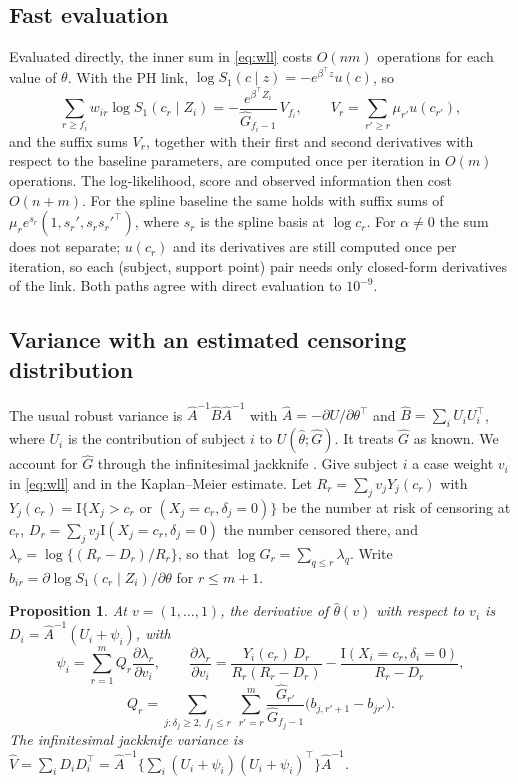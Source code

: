 \documentclass[11pt]{article}
\newtheorem{proposition}{Proposition}
\newcommand{\I}{\mathrm{I}}
\newcommand{\T}{\top}
\newcommand{\Ghat}{\widehat G}
\begin{document}
\subsection{Fast evaluation}\label{sec:fast}
Evaluated directly, the inner sum in \eqref{eq:wll} costs $O(nm)$ operations for each value of
$\theta$. With the PH link, $\log S_1(c \mid z) = -e^{\beta^\T z} u(c)$, so
\[
\sum_{r \ge f_i} w_{ir} \log S_1(c_r \mid Z_i) = -\frac{e^{\beta^\T Z_i}}{\Ghat_{f_i - 1}} \, V_{f_i},
\qquad V_r = \sum_{r' \ge r} \mu_{r'} u(c_{r'}),
\]
and the suffix sums $V_r$, together with their first and second derivatives with respect to the
baseline parameters, are computed once per iteration in $O(m)$ operations. The log-likelihood,
score and observed information then cost $O(n + m)$. For the spline baseline the same holds with
suffix sums of $\mu_r e^{s_r}(1, s_r', s_r s_r'^\T)$, where $s_r$ is the spline basis at $\log c_r$.
For $\alpha \ne 0$ the sum does not separate; $u(c_r)$ and its derivatives are still computed
once per iteration, so each (subject, support point) pair needs only closed-form derivatives of
the link. Both paths agree with direct evaluation to $10^{-9}$.

\subsection{Variance with an estimated censoring distribution}\label{sec:psi}
The usual robust variance \citep{white1982} is $\hat A^{-1} \hat B \hat A^{-1}$ with
$\hat A = -\partial U/\partial \theta^\T$ and $\hat B = \sum_i U_i U_i^\T$, where $U_i$ is the
contribution of subject $i$ to $U(\hat\theta; \Ghat)$. It treats $\Ghat$ as known. We account for
$\Ghat$ through the infinitesimal jackknife \citep{efron1982}. Give subject $i$ a case weight $v_i$
in \eqref{eq:wll} and in the Kaplan--Meier estimate. Let $R_r = \sum_j v_j Y_j(c_r)$ with
$Y_j(c_r) = \I\{X_j > c_r \text{ or } (X_j = c_r, \delta_j = 0)\}$ be the number at risk of
censoring at $c_r$, $D_r = \sum_j v_j \I(X_j = c_r, \delta_j = 0)$ the number censored there, and
$\lambda_r = \log\{(R_r - D_r)/R_r\}$, so that $\log \Ghat_r = \sum_{q \le r} \lambda_q$. Write
$b_{ir} = \partial \log S_1(c_r \mid Z_i)/\partial\theta$ for $r \le m + 1$.

\begin{proposition}\label{prop:psi}
At $v = (1, \dots, 1)$, the derivative of $\hat\theta(v)$ with respect to $v_i$ is
$D_i = \hat A^{-1}(U_i + \psi_i)$, with
\begin{equation}\label{eq:psi}
\psi_i = \sum_{r=1}^{m} Q_r \frac{\partial \lambda_r}{\partial v_i}, \qquad
\frac{\partial \lambda_r}{\partial v_i} = \frac{Y_i(c_r)\, D_r}{R_r (R_r - D_r)} - \frac{\I(X_i = c_r, \delta_i = 0)}{R_r - D_r},
\end{equation}
\begin{equation}\label{eq:Q}
Q_r = \sum_{j : \delta_j \ge 2,\ f_j \le r} \ \sum_{r' = r}^{m} \frac{\Ghat_{r'}}{\Ghat_{f_j - 1}} \big(b_{j, r'+1} - b_{j r'}\big).
\end{equation}
The infinitesimal jackknife variance is
$\hat V = \sum_i D_i D_i^\T = \hat A^{-1} \big\{\sum_i (U_i + \psi_i)(U_i + \psi_i)^\T\big\} \hat A^{-1}$.
\end{proposition}
\end{document}
